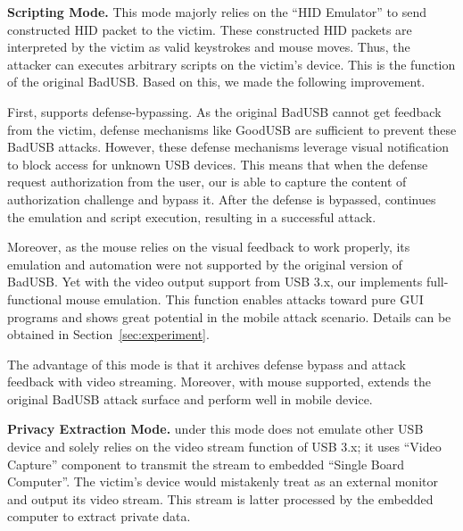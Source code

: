 \textbf{Scripting Mode.} This mode majorly relies on the ``HID Emulator'' to
send constructed HID packet to the victim. These constructed HID packets are
interpreted by the victim as valid keystrokes and mouse moves. Thus, the
attacker can executes arbitrary scripts on the victim's device. This is the
function of the original BadUSB. Based on this, we made the following
improvement.

First, \tool supports defense-bypassing. As the original BadUSB cannot get
feedback from the victim, defense mechanisms like GoodUSB
\cite{tian2015defending} are sufficient to prevent these BadUSB attacks.
However, these defense mechanisms leverage visual notification to block access
for unknown USB devices. This means that when the defense request authorization
from the user, our \tool is able to capture the content of authorization
challenge and bypass it. After the defense is bypassed, \tool continues the
emulation and script execution, resulting in a successful attack.

Moreover, as the mouse relies on the visual feedback to work properly, its
emulation and automation were not supported by the original version of BadUSB.
Yet with the video output support from USB 3.x, our \tool implements
full-functional mouse emulation. This function enables attacks toward pure GUI
programs and shows great potential in the mobile attack scenario. Details can
be obtained in Section~\ref{sec:experiment}.

The advantage of this mode is that it archives defense bypass and attack
feedback with video streaming.  
Moreover, with mouse
supported, \tool extends the original BadUSB attack surface and perform well in
mobile device.

\textbf{Privacy Extraction Mode.} \tool under this mode does not emulate other
USB device and solely relies on the video stream function of USB 3.x; it uses
``Video Capture'' component to transmit the stream to embedded ``Single Board Computer''. The victim's device would mistakenly treat \tool as an external monitor
and output its video stream. This stream is latter processed by the embedded
computer to extract private data.

